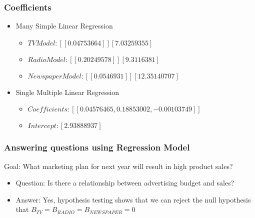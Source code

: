 \begin{frame}[fragile]\frametitle{Coefficients}
\begin{itemize}
\item Many Simple Linear Regression 
	\begin{itemize}
	\item $TV Model: [[ 0.04753664]] [ 7.03259355] $
	\item $Radio Model: [[ 0.20249578]] [ 9.3116381] $
	\item $Newspaper Model: [[ 0.0546931]] [ 12.35140707]$
	\end{itemize}

\item Single Multiple Linear Regression 
	\begin{itemize}
	\item $Coefficients: [[ 0.04576465, 0.18853002, -0.00103749]]$
	\item $Intercept: [2.93888937]$
	\end{itemize}
\end{itemize}
\end{frame}



\begin{frame}[fragile]\frametitle{Answering questions using Regression Model}
 Goal: What marketing plan for next year will result in high product sales?
\begin{itemize}
\item Question: Is there a relationship between advertising budget and sales?
\item Answer: Yes, hypothesis testing shows that we can reject the null hypothesis that $B_{TV} = B_{RADIO} = B_{NEWSPAPER} = 0$
\end{itemize}
\end{frame}


